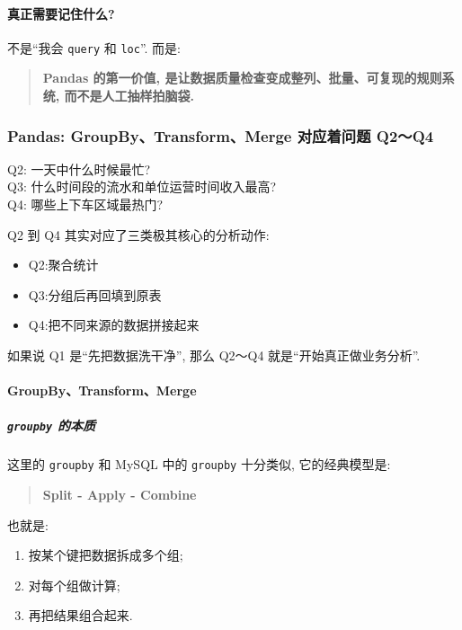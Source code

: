 \documentclass[11pt]{article}
\providecommand{\tightlist}{%
      \setlength{\itemsep}{0pt}\setlength{\parskip}{0pt}}
\begin{document}
    \paragraph{真正需要记住什么?}\label{ux771fux6b63ux9700ux8981ux8bb0ux4f4fux4ec0ux4e48}

    不是``我会 \texttt{query} 和 \texttt{loc}''. 而是:

\begin{quote}
\textbf{Pandas 的第一价值,
是让数据质量检查变成整列、批量、可复现的规则系统, 而不是人工抽样拍脑袋.}
\end{quote}

    \subsubsection{Pandas: GroupBy、Transform、Merge 对应着问题
Q2～Q4}\label{pandas-groupbytransformmerge-ux5bf9ux5e94ux7740ux95eeux9898-q2q4}

    Q2: 一天中什么时候最忙?\\
Q3: 什么时间段的流水和单位运营时间收入最高?\\
Q4: 哪些上下车区域最热门?

Q2 到 Q4 其实对应了三类极其核心的分析动作:

\begin{itemize}
\tightlist
\item
  Q2:聚合统计
\item
  Q3:分组后再回填到原表
\item
  Q4:把不同来源的数据拼接起来
\end{itemize}

如果说 Q1 是``先把数据洗干净'', 那么 Q2～Q4 就是``开始真正做业务分析''.

    \paragraph{GroupBy、Transform、Merge}\label{groupbytransformmerge}

    \subparagraph{\texorpdfstring{\texttt{groupby}
的本质}{groupby 的本质}}\label{groupby-ux7684ux672cux8d28}

    这里的 \texttt{groupby} 和 MySQL 中的 \texttt{groupby} 十分类似,
它的经典模型是:

\begin{quote}
\textbf{Split - Apply - Combine}
\end{quote}

也就是:

\begin{enumerate}
\def\labelenumi{\arabic{enumi}.}
\tightlist
\item
  按某个键把数据拆成多个组;
\item
  对每个组做计算;
\item
  再把结果组合起来.
\end{enumerate}
\end{document}
